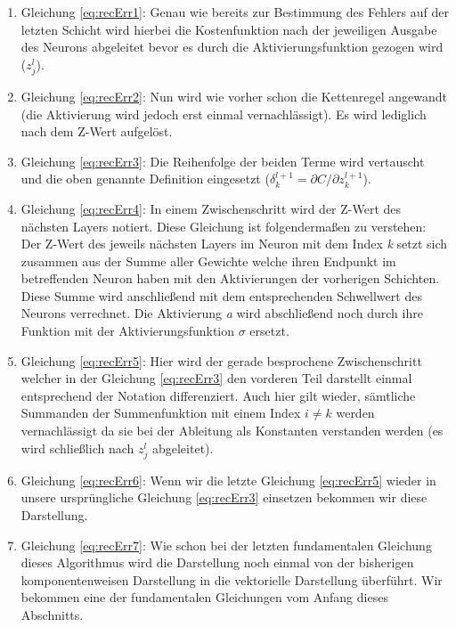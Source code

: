 \begin{enumerate}

\item Gleichung \ref{eq:recErr1}: Genau wie bereits zur Bestimmung des Fehlers auf der letzten Schicht wird hierbei die Kostenfunktion nach der jeweiligen Ausgabe des Neurons abgeleitet bevor es durch die Aktivierungsfunktion gezogen wird ($z^l_j$). 

\item Gleichung \ref{eq:recErr2}: Nun wird wie vorher schon die Kettenregel angewandt (die Aktivierung wird jedoch erst einmal vernachlässigt). Es wird lediglich nach dem Z-Wert aufgelöst.

\item Gleichung \ref{eq:recErr3}: Die Reihenfolge der beiden Terme wird vertauscht und die oben genannte Definition eingesetzt ($\delta^{l+1}_k = \partial C / \partial z^{l+1}_k$). 

\item Gleichung \ref{eq:recErr4}: In einem Zwischenschritt wird der Z-Wert des nächsten Layers notiert. Diese Gleichung ist folgendermaßen zu verstehen: Der Z-Wert des jeweils nächsten Layers im Neuron mit dem Index \emph{k} setzt sich zusammen aus der Summe aller Gewichte welche ihren Endpunkt im betreffenden Neuron haben mit den Aktivierungen der vorherigen Schichten. Diese Summe wird anschließend mit dem entsprechenden Schwellwert des Neurons verrechnet. Die Aktivierung \emph{a} wird abschließend noch durch ihre Funktion mit der Aktivierungsfunktion $\sigma$ ersetzt. 

\item Gleichung \ref{eq:recErr5}: Hier wird der gerade besprochene Zwischenschritt welcher in der Gleichung \ref{eq:recErr3} den vorderen Teil darstellt einmal entsprechend der Notation differenziert. Auch hier gilt wieder, sämtliche Summanden der Summenfunktion mit einem Index $i \neq k$ werden vernachlässigt da sie bei der Ableitung als Konstanten verstanden werden (es wird schließlich nach $z^l_j$ abgeleitet). 

\item Gleichung \ref{eq:recErr6}: Wenn wir die letzte Gleichung \ref{eq:recErr5} wieder in unsere ursprüngliche Gleichung \ref{eq:recErr3} einsetzen bekommen wir diese Darstellung. 

\item Gleichung \ref{eq:recErr7}: Wie schon bei der letzten fundamentalen Gleichung dieses Algorithmus wird die Darstellung noch einmal von der bisherigen komponentenweisen Darstellung in die vektorielle Darstellung überführt. Wir bekommen eine der fundamentalen Gleichungen vom Anfang dieses Abschnitts. 

\end{enumerate}




